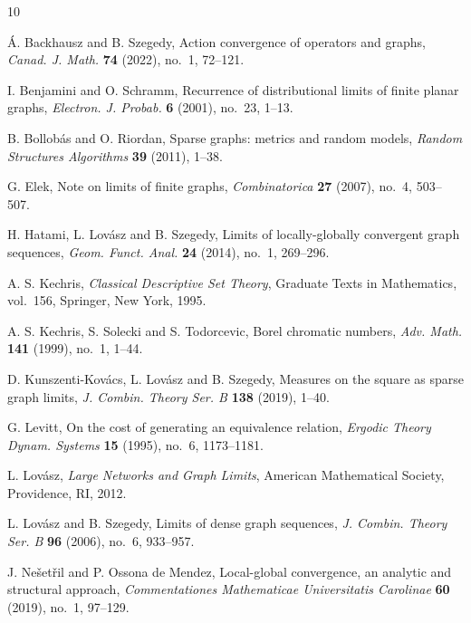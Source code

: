 \documentclass[11pt]{amsart}
\theoremstyle{remark}
\begin{document}
\begin{thebibliography}{10}

\'A. Backhausz and B. Szegedy,
Action convergence of operators and graphs,
\emph{Canad. J. Math.} \textbf{74} (2022), no.~1, 72--121.

I. Benjamini and O. Schramm,
Recurrence of distributional limits of finite planar graphs,
\emph{Electron. J. Probab.} \textbf{6} (2001), no.~23, 1--13.

B. Bollob\'as and O. Riordan,
Sparse graphs: metrics and random models,
\emph{Random Structures Algorithms} \textbf{39} (2011), 1--38.

G. Elek,
Note on limits of finite graphs,
\emph{Combinatorica} \textbf{27} (2007), no.~4, 503--507.

H. Hatami, L. Lov\'asz and B. Szegedy,
Limits of locally-globally convergent graph sequences,
\emph{Geom. Funct. Anal.} \textbf{24} (2014), no.~1, 269--296.

A. S. Kechris,
\emph{Classical Descriptive Set Theory},
Graduate Texts in Mathematics, vol.~156,
Springer, New York, 1995.

A. S. Kechris, S. Solecki and S. Todorcevic,
Borel chromatic numbers,
\emph{Adv. Math.} \textbf{141} (1999), no.~1, 1--44.

D. Kunszenti-Kov\'acs, L. Lov\'asz and B. Szegedy,
Measures on the square as sparse graph limits,
\emph{J. Combin. Theory Ser. B} \textbf{138} (2019), 1--40.

G. Levitt,
On the cost of generating an equivalence relation,
\emph{Ergodic Theory Dynam. Systems} \textbf{15} (1995), no.~6, 1173--1181.

L. Lov\'asz,
\emph{Large Networks and Graph Limits},
American Mathematical Society, Providence, RI, 2012.

L. Lov\'asz and B. Szegedy,
Limits of dense graph sequences,
\emph{J. Combin. Theory Ser. B} \textbf{96} (2006), no.~6, 933--957.

J. Ne\v{s}et\v{r}il and P. Ossona de Mendez,
Local-global convergence, an analytic and structural approach,
\emph{Commentationes Mathematicae Universitatis Carolinae}
\textbf{60} (2019), no.~1, 97--129.

\end{thebibliography}
\end{document}
